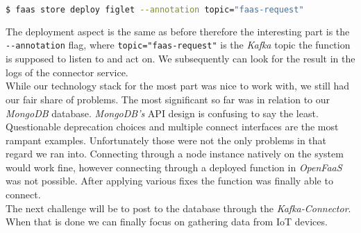 \begin{lstlisting}[language=bash]
  $ faas store deploy figlet --annotation topic="faas-request"
\end{lstlisting}

The deployment aspect is the same as before therefore the interesting part is the \texttt{-{}-annotation} flag, where \texttt{topic="faas-request"} is the \textit{Kafka} topic the function is supposed to listen to and act on. We subsequently can look for the result in the logs of the connector service. \\
While our technology stack for the most part was nice to work with, we still had our fair share of problems. The most significant so far was in relation to our \textit{MongoDB} database. \textit{MongoDB's} API design is confusing to say the least. Questionable deprecation choices and multiple connect interfaces are the most rampant examples. Unfortunately those were not the only problems in that regard we ran into. Connecting through a node instance natively on the system would work fine, however connecting through a deployed function in \textit{OpenFaaS} was not possible. After applying various fixes the function was finally able to connect. \\
The next challenge will be to post to the database through the \textit{Kafka-Connector}. When that is done we can finally focus on gathering data from IoT devices.
